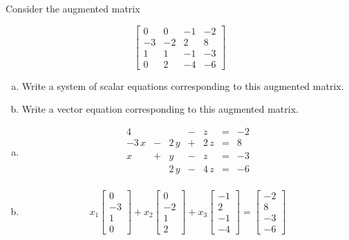 
\begin{exerciseStatement}


 Consider the augmented matrix 

\[ \left[\begin{array}{ccc|c}
0 & 0 & -1 & -2 \\
-3 & -2 & 2 & 8 \\
1 & 1 & -1 & -3 \\
0 & 2 & -4 & -6
\end{array}\right] \]
\begin{enumerate}[(a)]
\item  Write a system of scalar equations corresponding to this augmented matrix. 
\item  Write a vector equation corresponding to this augmented matrix. 
\end{enumerate}
    
\end{exerciseStatement}
    
\begin{exerciseAnswer} 

\begin{enumerate}[(a)]
\item 
\begin{alignat*}{4}  & &  &-& z &=& -2 \\-3 \, x &-& 2 \, y &+& 2 \, z &=& 8 \\x &+& y &-& z &=& -3 \\ & & 2 \, y &-& 4 \, z &=& -6 \\ \end{alignat*}
            
\item \[ x_{1} \left[\begin{array}{c}
0 \\
-3 \\
1 \\
0
\end{array}\right] + x_{2} \left[\begin{array}{c}
0 \\
-2 \\
1 \\
2
\end{array}\right] + x_{3} \left[\begin{array}{c}
-1 \\
2 \\
-1 \\
-4
\end{array}\right] = \left[\begin{array}{c}
-2 \\
8 \\
-3 \\
-6
\end{array}\right] \]
\end{enumerate}
    
\end{exerciseAnswer}
    
